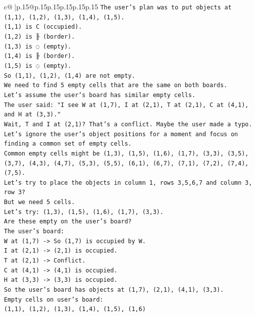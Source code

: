 \documentclass{article}
\begin{document}
{\begin{supertabular}{c@{$\;$}|p{.15\linewidth}@{}p{.15\linewidth}p{.15\linewidth}p{.15\linewidth}p{.15\linewidth}p{.15\linewidth}}
{{{\texttt{The user's plan was to put objects at (1,1), (1,2), (1,3), (1,4), (1,5).} \\
\texttt{(1,1) is C (occupied).} \\
\texttt{(1,2) is ╟ (border).} \\
\texttt{(1,3) is ◌ (empty).} \\
\texttt{(1,4) is ╟ (border).} \\
\texttt{(1,5) is ◌ (empty).} \\
\texttt{So (1,1), (1,2), (1,4) are not empty.} \\
\texttt{We need to find 5 empty cells that are the same on both boards.} \\
\texttt{Let's assume the user's board has similar empty cells.} \\
\texttt{The user said: "I see W at (1,7), I at (2,1), T at (2,1), C at (4,1), and H at (3,3)."} \\
\texttt{Wait, T and I at (2,1)? That's a conflict. Maybe the user made a typo.} \\
\texttt{Let's ignore the user's object positions for a moment and focus on finding a common set of empty cells.} \\
\texttt{Common empty cells might be (1,3), (1,5), (1,6), (1,7), (3,3), (3,5), (3,7), (4,3), (4,7), (5,3), (5,5), (6,1), (6,7), (7,1), (7,2), (7,4), (7,5).} \\
\texttt{Let's try to place the objects in column 1, rows 3,5,6,7 and column 3, row 3?} \\
\texttt{But we need 5 cells.} \\
\texttt{Let's try: (1,3), (1,5), (1,6), (1,7), (3,3).} \\
\texttt{Are these empty on the user's board?} \\
\texttt{The user's board:} \\
\texttt{W at (1,7) {-}> So (1,7) is occupied by W.} \\
\texttt{I at (2,1) {-}> (2,1) is occupied.} \\
\texttt{T at (2,1) {-}> Conflict.} \\
\texttt{C at (4,1) {-}> (4,1) is occupied.} \\
\texttt{H at (3,3) {-}> (3,3) is occupied.} \\
\texttt{So the user's board has objects at (1,7), (2,1), (4,1), (3,3).} \\
\texttt{Empty cells on user's board:} \\
\texttt{(1,1), (1,2), (1,3), (1,4), (1,5), (1,6)} \\
}}}
\end{supertabular}}
\end{document}

